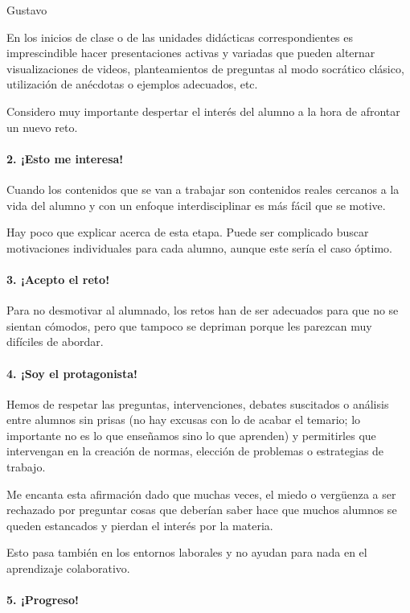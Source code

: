 \begin{opin}{\guscolor}{Gustavo}
\begin{leftbar}{\guscolor}
En los inicios de clase o de las unidades didácticas correspondientes es imprescindible hacer presentaciones activas y variadas que pueden alternar visualizaciones de videos, planteamientos de preguntas al modo socrático clásico, utilización de anécdotas o ejemplos adecuados, etc.

Considero muy importante despertar el interés del alumno a la hora de afrontar un nuevo reto.

\paragraph{2. ¡Esto me interesa!}

Cuando los contenidos que se van a trabajar son contenidos reales cercanos a la vida del alumno y con un enfoque interdisciplinar es más fácil que se motive.

Hay poco que explicar acerca de esta etapa. Puede ser complicado buscar motivaciones individuales para cada alumno, aunque este sería el caso óptimo.

\paragraph{3. ¡Acepto el reto!}

Para no desmotivar al alumnado, los retos han de ser adecuados para que no se sientan cómodos, pero que tampoco se depriman porque les parezcan muy difíciles de abordar.

\paragraph{4. ¡Soy el protagonista!}

Hemos de respetar las preguntas, intervenciones, debates suscitados o análisis entre alumnos sin prisas (no hay excusas con lo de acabar el temario; lo importante no es lo que enseñamos sino lo que aprenden) y permitirles que intervengan en la creación de normas, elección de problemas o estrategias de trabajo.

Me encanta esta afirmación dado que muchas veces, el miedo o vergüenza a ser rechazado por preguntar cosas que deberían saber hace que muchos alumnos se queden estancados y pierdan el interés por la materia.

Esto pasa también en los entornos laborales y no ayudan para nada en el aprendizaje colaborativo.

\paragraph{5. ¡Progreso!}


\end{leftbar}
\end{opin}
